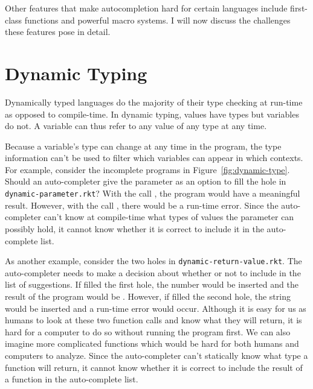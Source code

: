 \documentclass[ms,electronic,twosidetoc,letterpaper,chaptercenter,parttop,lol,lof,lot]{byumsphd}
\begin{document}
Other features that make autocompletion hard for certain languages include first-class
functions and powerful macro systems. I will now discuss the challenges these features
pose in detail.


\section{Dynamic Typing}

Dynamically typed languages do the majority of their type checking at run-time as opposed
to compile-time. In dynamic typing, values have types but variables do not. A variable can
thus refer to any value of any type at any time.

Because a variable's type can change at any time in the program, the type information
can't be used to filter which variables can appear in which contexts. For example,
consider the incomplete programs in Figure~\ref{fig:dynamic-type}. Should an
auto-completer give the parameter  as an option to fill the hole in
\texttt{dynamic-parameter.rkt}?  With the call , the program would have a
meaningful result. However, with the call , there would be a run-time
error. Since the auto-completer can't know at compile-time what types of values the
parameter  can possibly hold, it cannot know whether it is correct to include it
in the auto-complete list.

As another example, consider the two holes in \texttt{dynamic-return-value.rkt}. The
auto-completer needs to make a decision about whether or not to include  in
the list of suggestions. If  filled the first hole, the number 
would be inserted and the result of the program would be . However, if
 filled the second hole, the string  would be inserted and a
run-time error would occur. Although it is easy for us as humans to look at these two
function calls and know what they will return, it is hard for a computer to do so without
running the program first. We can also imagine more complicated functions which would be
hard for both humans and computers to analyze. Since the auto-completer can't statically
know what type a function will return, it cannot know whether it is correct to include the
result of a function in the auto-complete list.
\end{document}

